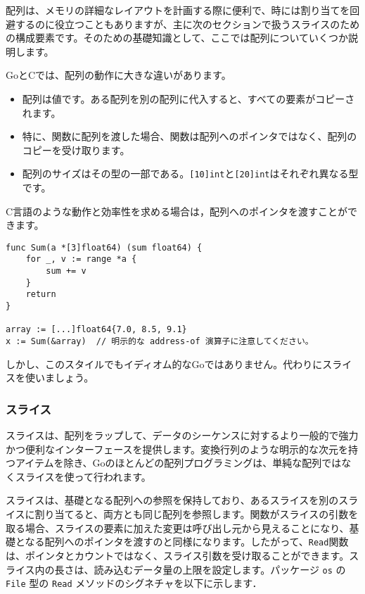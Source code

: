 \documentclass{jsarticle}
\begin{document}
配列は、メモリの詳細なレイアウトを計画する際に便利で、時には割り当てを回避するのに役立つこともありますが、主に次のセクションで扱うスライスのための構成要素です。そのための基礎知識として、ここでは配列についていくつか説明します。

GoとCでは、配列の動作に大きな違いがあります。

\begin{itemize}
\item
  配列は値です。ある配列を別の配列に代入すると、すべての要素がコピーされます。
\item
  特に、関数に配列を渡した場合、関数は配列へのポインタではなく、配列のコピーを受け取ります。
\item
  配列のサイズはその型の一部である。\texttt{[10]int}と\texttt{[20]int}はそれぞれ異なる型です。
\end{itemize}

C言語のような動作と効率性を求める場合は，配列へのポインタを渡すことができます。

\begin{lstlisting}[numbers=none]
func Sum(a *[3]float64) (sum float64) {
    for _, v := range *a {
        sum += v
    }
    return
}

array := [...]float64{7.0, 8.5, 9.1}
x := Sum(&array)  // 明示的な address-of 演算子に注意してください。
\end{lstlisting}

しかし、このスタイルでもイディオム的なGoではありません。代わりにスライスを使いましょう。

\subsubsection{スライス}

スライスは、配列をラップして、データのシーケンスに対するより一般的で強力かつ便利なインターフェースを提供します。変換行列のような明示的な次元を持つアイテムを除き、Goのほとんどの配列プログラミングは、単純な配列ではなくスライスを使って行われます。

スライスは、基礎となる配列への参照を保持しており、あるスライスを別のスライスに割り当てると、両方とも同じ配列を参照します。関数がスライスの引数を取る場合、スライスの要素に加えた変更は呼び出し元から見えることになり、基礎となる配列へのポインタを渡すのと同様になります。したがって、\texttt{Read}関数は、ポインタとカウントではなく、スライス引数を受け取ることができます。スライス内の長さは、読み込むデータ量の上限を設定します。パッケージ
\texttt{os} の \texttt{File} 型の \texttt{Read}
メソッドのシグネチャを以下に示します．
\end{document}
